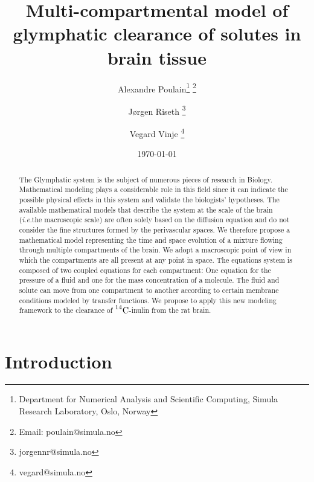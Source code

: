 \documentclass[10pt]{article}
\title{Multi-compartmental model of glymphatic clearance of solutes in brain tissue}
\author{Alexandre Poulain\thanks{Department for Numerical Analysis and Scientific Computing, Simula Research Laboratory, Oslo, Norway} 
\thanks{Email: poulain@simula.no} \and Jørgen Riseth \thanks{jorgennr@simula.no} \and Vegard Vinje \thanks{vegard@simula.no}}
\date{\today}
\newcommand{\VV}[1]{\textcolor{red}{VV: #1}}
\newcommand{\ie}{\emph{i.e.}\;}
\newcommand{\1}{^{(1)}}
\newcommand{\2}{^{(2)}}
\newcommand{\Cinulin}{$\prescript{14}{}{\text{C}}$-inulin }
\begin{document}
\maketitle


\begin{abstract}
    The Glymphatic system is the subject of numerous pieces of research in Biology. Mathematical modeling plays a considerable role in this field since it can indicate the possible physical effects in this system and validate the biologists' hypotheses. The available mathematical models that describe the system at the scale of the brain (\ie the macroscopic scale) are often solely based on the diffusion equation and do not consider the fine structures formed by the perivascular spaces.   
 We therefore propose a mathematical model representing the time and space evolution of a mixture flowing through multiple compartments of the brain. We adopt a macroscopic point of view in which the compartments are all present at any point in space. The equations system is composed of two coupled equations for each compartment: One equation for the pressure of a fluid and one for the mass concentration of a molecule. The fluid and solute can move from one compartment to another according to certain membrane conditions modeled by transfer functions. We propose to apply this new modeling framework to the clearance of \Cinulin from the rat brain. 
\end{abstract}


\section{Introduction}

\end{document}
